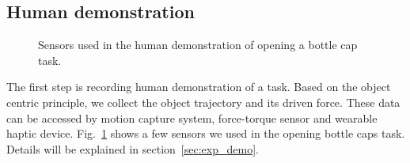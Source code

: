 \subsection{Human demonstration}
\label{sec:demo}


\begin{figure}
  \centering
    \caption{\scriptsize{Sensors used in the human demonstration of opening a bottle cap task.}}
  \label{fig:devices}
\end{figure}

The first step is recording human demonstration of a task. Based on the object centric principle, we collect the object trajectory and its driven force. These data can be accessed by motion capture system, force-torque sensor and wearable haptic device. Fig.~\ref{fig:devices} shows a few sensors we used in the opening bottle caps task. Details will be explained in section~\ref{sec:exp_demo}.


